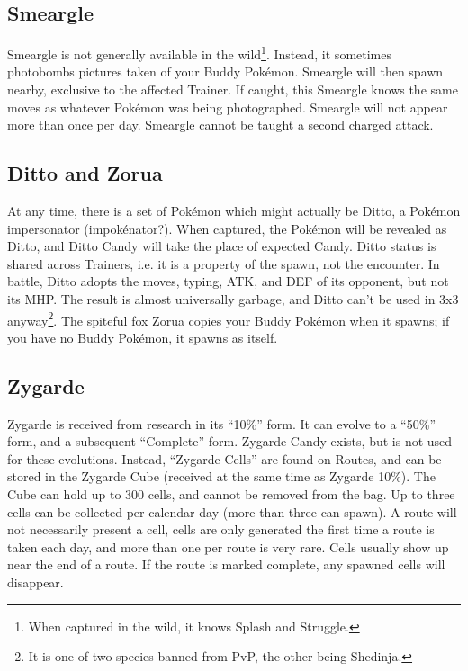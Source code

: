 \subsection{Smeargle}
\label{subsec:smeargle}
Smeargle is not generally available in the wild\footnote{When captured in the wild, it knows Splash and Struggle.}.
Instead, it sometimes photobombs pictures taken of your Buddy Pokémon.
Smeargle will then spawn nearby, exclusive to the affected Trainer.
If caught, this Smeargle knows the same moves as whatever Pokémon was being photographed.
Smeargle will not appear more than once per day.
Smeargle cannot be taught a second charged attack.

\subsection{Ditto and Zorua}
\label{subsec:ditto}
At any time, there is a set of Pokémon which might actually be Ditto,
  a Pokémon impersonator (impokénator?).
When captured, the Pokémon will be revealed as Ditto, and Ditto Candy will take
  the place of expected Candy.
Ditto status is shared across Trainers, i.e. it is a property of the spawn, not the encounter.
In battle, Ditto adopts the moves, typing, ATK, and DEF of its opponent, but not its MHP\@.
The result is almost universally garbage, and Ditto can't be used in 3x3 anyway\footnote{It is one of two species banned from PvP, the other being Shedinja.}.
The spiteful fox Zorua copies your Buddy Pokémon when it spawns; if you have no Buddy
  Pokémon, it spawns as itself.

\subsection{Zygarde}
\label{subsec:zygarde}
Zygarde is received from research in its ``10\%'' form.
It can evolve to a ``50\%'' form, and a subsequent ``Complete'' form.
Zygarde Candy exists, but is not used for these evolutions.
Instead, ``Zygarde Cells'' are found on Routes, and can be stored in the Zygarde Cube
 (received at the same time as Zygarde 10\%).
The Cube can hold up to 300 cells, and cannot be removed from the bag.
Up to three cells can be collected per calendar day (more than three can spawn).
A route will not necessarily present a cell, cells are only generated the first
  time a route is taken each day, and more than one per route is very rare.
Cells usually show up near the end of a route.
If the route is marked complete, any spawned cells will disappear.

